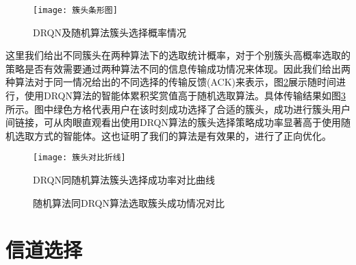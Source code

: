 \begin{figure}[htbp]
	\centering
	\texttt{[image: 簇头条形图]}
	\caption{DRQN及随机算法簇头选择概率情况}
	\label{fig：簇头条形图}
\end{figure}
这里我们给出不同簇头在两种算法下的选取统计概率，对于个别簇头高概率选取的策略是否有效需要通过两种算法不同的信息传输成功情况来体现。因此我们给出两种算法对于同一情况给出的不同选择的传输反馈(ACK)来表示，图\ref{fig：簇头对比折线}展示随时间进行，使用DRQN算法的智能体累积奖赏值高于随机选取算法。具体传输结果如图\ref{fig:簇头奖励对比}所示。图中绿色方格代表用户在该时刻成功选择了合适的簇头，成功进行簇头用户间链接，可从肉眼直观看出使用DRQN算法的簇头选择策略成功率显著高于使用随机选取方式的智能体。这也证明了我们的算法是有效果的，进行了正向优化。
\begin{figure}[htbp]
	\centering
	\texttt{[image: 簇头对比折线]}
	\caption{DRQN同随机算法簇头选择成功率对比曲线}
	\label{fig：簇头对比折线}
\end{figure}

\begin{figure}[htbp]
	\begin{minipage}{\textwidth}
		\centering
		\subfigure{\label{fig:簇头奖励DRQN}}\addtocounter{subfigure}{-2}
		\hspace{1em}
		\subfigure{\label{fig:簇头奖励random}}\addtocounter{subfigure}{-2}
		\hspace{1em}	
	\end{minipage}
	\vspace{0.2em}
	\caption{随机算法同DRQN算法选取簇头成功情况对比}\label{fig:簇头奖励对比}
\end{figure}


\section{信道选择}
